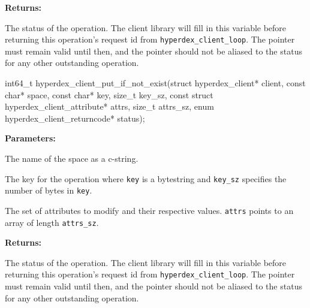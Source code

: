 \noindent\textbf{Returns:}
\begin{description}[labelindent=\widthof{{\texttt{status}}},leftmargin=*,noitemsep,nolistsep,align=right]
\item[\texttt{status}] The status of the operation.  The client library will fill in this variable before returning this operation's request id from \texttt{hyperdex\_client\_loop}.  The pointer must remain valid until then, and the pointer should not be aliased to the status for any other outstanding operation.
\end{description}

\funcsep
{}
\begin{ccode}
int64_t hyperdex_client_put_if_not_exist(struct hyperdex_client* client,
                const char* space,
                const char* key, size_t key_sz,
                const struct hyperdex_client_attribute* attrs, size_t attrs_sz,
                enum hyperdex_client_returncode* status);
\end{ccode}
\funcdesc 

\noindent\textbf{Parameters:}
\begin{description}[labelindent=\widthof{{\texttt{attrs}, \texttt{attrs\_sz}}},leftmargin=*,noitemsep,nolistsep,align=right]
\item[\texttt{space}] The name of the space as a c-string.
\item[\texttt{key}, \texttt{key\_sz}] The key for the operation where \texttt{key} is a bytestring and \texttt{key\_sz} specifies the number of bytes in \texttt{key}.
\item[\texttt{attrs}, \texttt{attrs\_sz}] The set of attributes to modify and their respective values.  \texttt{attrs} points to an array of length \texttt{attrs\_sz}.
\end{description}

\noindent\textbf{Returns:}
\begin{description}[labelindent=\widthof{{\texttt{status}}},leftmargin=*,noitemsep,nolistsep,align=right]
\item[\texttt{status}] The status of the operation.  The client library will fill in this variable before returning this operation's request id from \texttt{hyperdex\_client\_loop}.  The pointer must remain valid until then, and the pointer should not be aliased to the status for any other outstanding operation.
\end{description}

